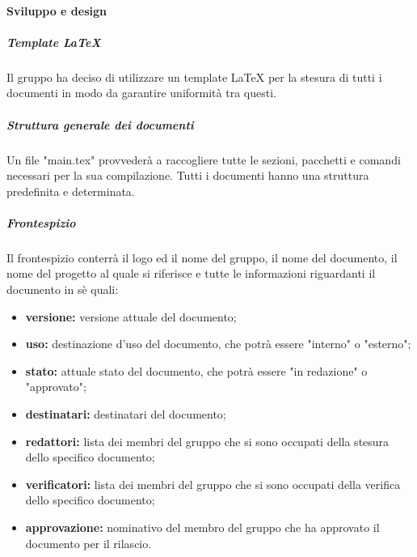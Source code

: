 			\paragraph{Sviluppo e design}
				\subparagraph{Template LaTeX}
					Il gruppo ha deciso di utilizzare un template LaTeX per la stesura di tutti i documenti in modo da garantire uniformità tra questi.	
				\subparagraph{Struttura generale dei documenti}		
					Un file "main.tex" provvederà a raccogliere tutte le sezioni, pacchetti e comandi necessari per la sua compilazione. Tutti i documenti hanno una struttura predefinita e determinata.
				\subparagraph{Frontespizio}	
					Il frontespizio conterrà il logo ed il nome del gruppo, il nome del documento, il nome del progetto al quale si riferisce e tutte le informazioni riguardanti il documento in sè quali:
					\begin{itemize}
						\item \textbf{versione:} versione attuale del documento;
						\item \textbf{uso:} destinazione d'uso del documento, che potrà essere "interno" o "esterno";
						\item \textbf{stato:} attuale stato del documento, che potrà essere "in redazione" o "approvato";
						\item \textbf{destinatari:} destinatari del documento;
						\item \textbf{redattori:} lista dei membri del gruppo che si sono occupati della stesura dello specifico documento;
						\item \textbf{verificatori:} lista dei membri del gruppo che si sono occupati della verifica dello specifico documento;
						\item \textbf{approvazione:} nominativo del membro del gruppo che ha approvato il documento per il rilascio.
					\end{itemize}
					
